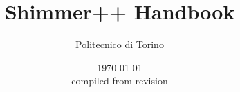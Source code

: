 \documentclass[10pt]{article}
\title{Shimmer++ Handbook}
\author{Politecnico di Torino}
\date{\today\\{\footnotesize compiled from revision \texttt{\gitrevision}}}
\begin{document}
\maketitle
\tableofcontents

\newcommand{\cred}[1]{\textcolor{red}{{#1}}}






\end{document}
